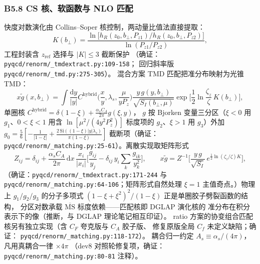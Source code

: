 \documentclass[UTF8]{ctexart}
\begin{document}
\subsubsection{B5.8 CS 核、软函数与 NLO 匹配}
快度对数演化由 Collins--Soper 核控制，两动量比值法直接提取：
\begin{equation}
K(b_\perp)=\frac{\ln\!\big[h_R(z_0,b_\perp,P_{z1})/h_R(z_0,b_\perp,P_{z2})\big]}
{\ln(P_{z1}/P_{z2})},
\label{eq:cskernel}
\end{equation}
工程封装含 $z_{\mathrm{ref}}$ 选择与 $|K|\le3$ 截断保护
（确证：\texttt{\nolinkurl{pyqcd/renorm/_tmdextract.py:109-158}}；
回归斜率版 \texttt{\nolinkurl{pyqcd/renorm/_tmd.py:275-305}}）。
混合方案 TMD 匹配把准分布映射为光锥 TMD：
\begin{equation}
x\tilde g(x,b_\perp)=\int\frac{\mathrm dy}{|y|}
C^{\mathrm{hybrid}}\!\Big(\frac xy,\lambda_s,\frac{\mu}{yP_z}\Big)
\frac{y\,g(y,b_\perp)}{\sqrt{S_I(b_\perp,\mu)}}
\exp\!\Big[\frac12\ln\frac{\zeta_z}{\zeta}\,K(b_\perp)\Big],
\label{eq:tmdmatch}
\end{equation}
单圈核 $C^{\mathrm{hybrid}}=\delta(1-\xi)+\frac{\alpha_s C_A}{2\pi}g(\xi,y)$，
$g$ 按 Bjorken 变量三分区（$\xi<0$ 用 $g_1$、$0<\xi<1$ 用含
$\ln[\mu^2/(4y^2P_z^2)]$ 标度项的 $g_2$、$\xi>1$ 用 $g_3$）外加
$g_0=\frac56[-\frac{1}{|1-\xi|}+\frac{2\,\mathrm{Si}((1-\xi)|y|\lambda_s)}
{\pi(1-\xi)}]$ 截断项（确证：
\texttt{\nolinkurl{pyqcd/renorm/_matching.py:25-61}}）。离散实现取矩阵形式
\begin{equation}
Z_{ij}=\delta_{ij}+\frac{\alpha_s C_A}{2\pi}\,\mathrm dx\,
\frac{x_i}{|x_i|}\Big[\frac{g_{ij}}{y_j}
-\delta_{ij}\,y_i\sum_k\frac{g_{ik}}{y_k^2}\Big],\qquad
x\tilde g=Z^{-1}\Big[\frac{y\,g}{\sqrt{S_I}}\,e^{\frac12\ln(\zeta_z/\zeta)K}\Big],
\label{eq:Zmatrix}
\end{equation}
（确证：\texttt{\nolinkurl{pyqcd/renorm/_tmdextract.py:171-244}} 与
\texttt{\nolinkurl{pyqcd/renorm/_matching.py:64-106}}；矩阵形式自然处理
$\xi=1$ 主值奇点。）物理上 $g_1/g_2/g_3$ 的分子多项式
$(1-\xi+\xi^2)^2/(1-\xi)$ 正是单圈胶子劈裂函数的结构，
分区对数承载 $\overline{\mathrm{MS}}$ 标度依赖——匹配核即 DGLAP 演化核的
准分布在积分表示下的像（推断，与 DGLAP 理论笔记相互印证）。
ratio 方案的协变组合匹配核另有独立实现（含 $C_F$ 夸克版与 $C_A$ 胶子版、
修复原版全局 $C_f$ 未定义缺陷；确证：
\texttt{\nolinkurl{pyqcd/renorm/_matching.py:118-172}}）。
耦合归一约定 $A_s\equiv\alpha_s/(4\pi)$，凡用真耦合一律 $\times4\pi$
（dev8 对照轮修复项，确证：
\texttt{\nolinkurl{pyqcd/renorm/_matching.py:80-81}} 注释）。
\end{document}
